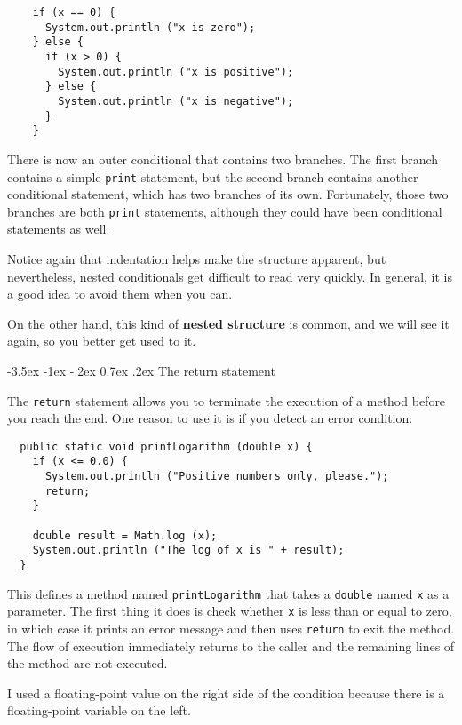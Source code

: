 \documentclass{book}
\makeatletter
\renewcommand{\section}{\@startsection 
    {section} {1} {0mm}%
    {-3.5ex \@plus -1ex \@minus -.2ex}%
    {0.7ex \@plus.2ex}%
    {\normalfont\Large\bfseries}}
\makeatother
\begin{document}
\begin{verbatim}
    if (x == 0) {
      System.out.println ("x is zero");
    } else {
      if (x > 0) {
        System.out.println ("x is positive");
      } else {
        System.out.println ("x is negative");
      }
    }
\end{verbatim}
%
There is now an outer conditional that contains two branches.  The
first branch contains a simple {\tt print} statement, but the second
branch contains another conditional statement, which has two branches
of its own.  Fortunately, those two branches are both {\tt print}
statements, although they could have been conditional statements as
well.

Notice again that indentation helps make the structure
apparent, but nevertheless, nested conditionals get difficult to read
very quickly.  In general, it is a good idea to avoid them when you
can.


On the other hand, this kind of {\bf nested structure} is common, and
we will see it again, so you better get used to it.

\section{The return statement}

The {\tt return} statement allows you to terminate the execution
of a method before you reach the end.  One reason to use it
is if you detect an error condition:

\begin{verbatim}
  public static void printLogarithm (double x) {
    if (x <= 0.0) {
      System.out.println ("Positive numbers only, please.");
      return;
    }

    double result = Math.log (x);
    System.out.println ("The log of x is " + result);
  }
\end{verbatim}
%
This defines a method named {\tt printLogarithm} that takes
a {\tt double} named {\tt x} as a parameter.  The first thing
it does is check whether {\tt x} is less than or equal to
zero, in which case it prints an error message and then uses
{\tt return} to exit the method.  The flow of execution
immediately returns to the caller and the remaining lines of
the method are not executed.

I used a floating-point value on the right side of the condition
because there is a floating-point variable on the left.
\end{document}
